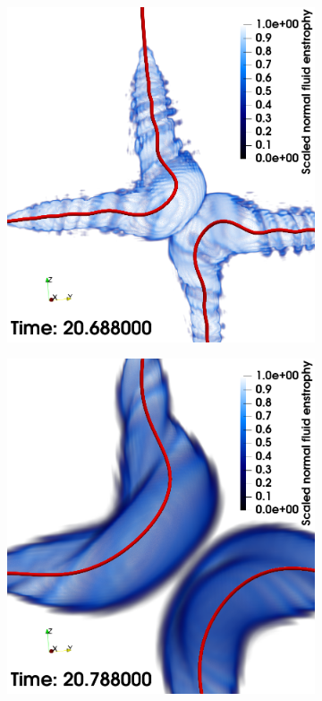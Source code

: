\documentclass[%
 reprint,
 amsmath,amssymb,
 aps,
 prl,
]{revtex4-2}
\begin{document}
\begin{figure}[t]
\begin{subfigure}[b]{0.24\textwidth}
	\end{subfigure}
    \begin{subfigure}[b]{0.24\textwidth}
		\centering
		\includegraphics*[width=\textwidth]{snap-3.png}
	\end{subfigure}
    \begin{subfigure}[b]{0.24\textwidth}
		\centering
		\includegraphics*[width=\textwidth]{snap-4.png}

\end{subfigure}
\end{figure}
\end{document}
